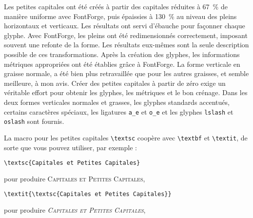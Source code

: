 \documentclass[12pt,english,french]{article}
\begin{document}
Les petites capitales ont été créés à partir des capitales réduites à \SI{67}{\%} de manière uniforme avec FontForge, puis épaissies à \SI{130}{\%} au niveau des pleins horizontaux et verticaux. Les résultats ont servi d'ébauche pour façonner chaque glyphe. Avec FontForge, les pleins ont été redimensionnés correctement, imposant souvent une refonte de la forme. Les résultats eux-mêmes sont la seule description possible de ces transformations. Après la création des glyphes, les informations métriques appropriées ont été établies grâce à FontForge. La forme verticale en graisse normale, a été bien plus retravaillée que pour les autres graisses, et semble meilleure, à mon avis. Créer des petites capitales à partir de zéro exige un véritable effort pour obtenir les glyphes, les métriques et le bon crénage. Dans les deux formes verticales normales et grasses, les glyphes standards accentués, certains caractères spéciaux, les ligatures \verb+a_e+ et \verb+o_e+ et les glyphes \texttt{lslash} et \texttt{oslash} sont fournis.



La macro pour les petites capitales \verb+\textsc+ coopère avec \verb+\textbf+ et \verb+\textit+, de sorte que vous pouvez utiliser, par exemple :

\begin{verbatim}
\textsc{Capitales et Petites Capitales}
\end{verbatim}
pour produire \textsc{Capitales et Petites Capitales},

\begin{verbatim}
\textit{\textsc{Capitales et Petites Capitales}}
\end{verbatim}
pour produire \textit{\textsc{Capitales et Petites Capitales}},
\end{document}
